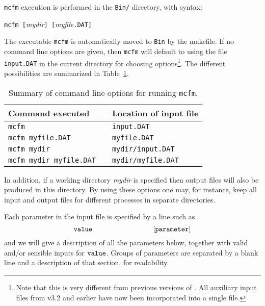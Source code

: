 \documentclass[12pt]{article}
\begin{document}
{\tt mcfm} execution is performed in the {\tt Bin/} directory,
with syntax:
\begin{center}
{\tt mcfm [}{\it mydir}{\tt ] [}{\it myfile}{\tt .DAT]}
\end{center}
The executable {\tt mcfm} is automatically moved to {\tt Bin} by the makefile.
If no command line options are given, then {\tt mcfm} will default
to using the file {\tt input.DAT} in the current directory for
choosing options\footnote{Note that this is very different from
previous versions of \MCFM. All auxiliary input files from v3.2 and
earlier have now been incorporated into a single file.}.
The different possibilities are summarized in Table~\ref{clopts}.
\begin{table}
\begin{center}
\begin{tabular}{l|cl}
Command executed && Location of input file \\
\hline
{\tt mcfm}                      && {\tt input.DAT} \\
{\tt mcfm myfile.DAT}           && {\tt myfile.DAT} \\
{\tt mcfm mydir}                && {\tt mydir/input.DAT} \\
{\tt mcfm mydir myfile.DAT}     && {\tt mydir/myfile.DAT} \\
\end{tabular}
\end{center}
\caption{Summary of command line options for running {\tt mcfm}.}
\label{clopts}
\end{table}
In addition, if a working directory {\it mydir} is specified then
output files will also be produced in this directory. By using these
options one may, for instance, keep all input and output files for
different processes in separate directories.

Each parameter in the input file is specified by a line such as
\begin{displaymath}
{\tt value} \hspace{3cm} {\tt [parameter]}
\end{displaymath}
and we will give a description of all the parameters below, together with
valid and/or sensible inputs for ${\tt value}$. Groups of parameters
are separated by a blank line and a description of that section, for
readability.
\end{document}
